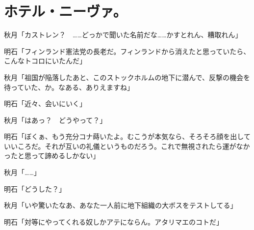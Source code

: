 \section*{ホテル・ニーヴァ。}

秋月「カストレン？　……どっかで聞いた名前だな……かすとれん、糟取れん」

明石「フィンランド憲法党の長老だ。フィンランドから消えたと思っていたら、こんなトコロにいたんだ」

秋月「祖国が陥落したあと、このストックホルムの地下に潜んで、反撃の機会を待っていた、か。なある、ありえますね」

明石「近々、会いにいく」

秋月「はあっ？　どうやって？」

明石「ぼくぁ、もう充分コナ蒔いたよ。むこうが本気なら、そろそろ顔を出していいころだ。それが互いの礼儀というものだろう。これで無視されたら運がなかったと思って諦めるしかない」

秋月「……」

明石「どうした？」

秋月「いや驚いたなあ、あなた一人前に地下組織の大ボスをテストしてる」

明石「対等にやってくれる奴しかアテにならん。アタリマエのコトだ」
